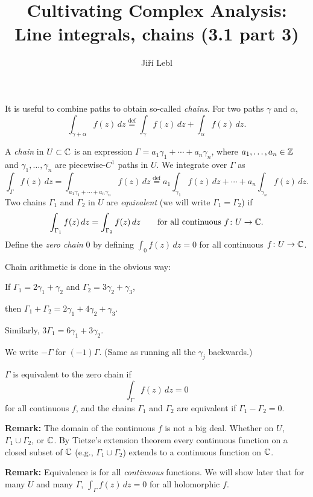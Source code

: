\documentclass[10pt,aspectratio=169]{beamer}
\author{Ji\v{r}\'i Lebl}
\institute[OSU]{%
Departemento pri Matematiko de Oklahoma {\^S}tata Universitato}
\title{Cultivating Complex Analysis:\\%
Line integrals, chains (3.1 part 3)}
\date{}
\begin{document}
\begin{frame}
\titlepage
\end{frame}

\begin{frame}
It is useful to combine paths to obtain so-called \emph{chains}.
\pause
For two paths $\gamma$ and $\alpha$,
\[
\int_{\gamma + \alpha} f(z) \, dz
\overset{\text{def}}{=}
\int_{\gamma} f(z) \, dz +
\int_{\alpha} f(z) \, dz .
\]

\pause

\begin{definition}
A \emph{chain} in $U \subset {\mathbb{C}}$ is an expression
$\Gamma = a_1 \gamma_1 + \cdots + a_n \gamma_n$,
where $a_1,\ldots,a_n \in {\mathbb{Z}}$ and $\gamma_1,\ldots,\gamma_n$
are piecewise-$C^1$ paths in $U$. \pause  We integrate over $\Gamma$ as
\[
\int_{\Gamma} f(z) \, dz
=
\int_{a_1 \gamma_1 + \cdots + a_n \gamma_n} f(z) \, dz
\overset{\text{def}}{=}
a_1 \int_{\gamma_1} f(z) \, dz +
\cdots
+
a_n \int_{\gamma_n} f(z) \, dz .
\]
\pause
Two chains $\Gamma_1$ and $\Gamma_2$ in 
$U$ are
\emph{equivalent} (we will write
$\Gamma_1=\Gamma_2$) if
\[
\int_{\Gamma_1} f(z) \, dz = 
\int_{\Gamma_2} f(z) \, dz
\qquad
\text{for all continuous } f \colon U \to {\mathbb{C}}.
\]
\pause
Define the \emph{zero chain} $0$ by defining 
$\int_0 f(z) \, dz = 0$ for all continuous $f \colon U \to {\mathbb{C}}$.
\end{definition}
\end{frame}

\begin{frame}
Chain arithmetic is done in the obvious way:

\medskip
\pause

If $\Gamma_1 = 2 \gamma_1 + \gamma_2$ and $\Gamma_2 = 3 \gamma_2 +
\gamma_3$,

then $\Gamma_1 + \Gamma_2 = 2 \gamma_1 + 4 \gamma_2 + \gamma_3$.

\medskip
\pause

Similarly, $3 \Gamma_1 = 6 \gamma_1 + 3 \gamma_2$.

\medskip
\pause

We write $-\Gamma$ for $(-1)\Gamma$. \quad (Same as running all the $\gamma_j$
backwards.)

\medskip
\pause

$\Gamma$ is equivalent to the zero chain if
\begin{equation*}
\int_\Gamma f(z)\, dz = 0
\end{equation*}
for all continuous $f$, and
the chains $\Gamma_1$ and $\Gamma_2$ are equivalent if $\Gamma_1 - \Gamma_2 = 0$.

\medskip
\pause

\textbf{Remark:}
The domain of the continuous $f$ is not a big deal.  Whether on
$U$, $\Gamma_1 \cup \Gamma_2$, or ${\mathbb{C}}$.
By Tietze's extension theorem
every continuous function on a closed subset of ${\mathbb{C}}$ (e.g., $\Gamma_1 \cup
\Gamma_2$) extends to a
continuous function on ${\mathbb{C}}$.

\medskip
\pause

\textbf{Remark:}
Equivalence is for all \emph{continuous} functions.
We will show later that for many $U$ and many $\Gamma$,
$\int_\Gamma f(z) \, dz = 0$ for all holomorphic $f$.
\end{frame}
\end{document}
